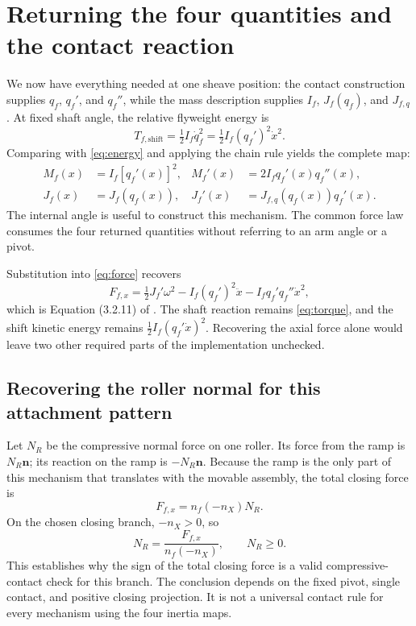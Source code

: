 \documentclass[11pt,letterpaper]{article}
\numberwithin{equation}{section}
\newcommand{\half}{\tfrac12}
\begin{document}
\section{Returning the four quantities and the contact reaction}
\label{sec:maps}

We now have everything needed at one sheave position: the contact construction supplies $q_f$, $q_f'$, and $q_f''$, while the mass description supplies $I_f$, $J_f(q_f)$, and $J_{f,q}$. At fixed shaft angle, the relative flyweight energy is
\begin{equation}
  T_{f,\mathrm{shift}}=\half I_f\dot q_f^2
                     =\half I_f(q_f')^2\dot x^2.
\end{equation}
Comparing with \cref{eq:energy} and applying the chain rule yields the complete map:
\begin{equation}
  \boxed{\begin{aligned}
    M_f(x)&=I_f[q_f'(x)]^2,&
    M_f'(x)&=2I_fq_f'(x)q_f''(x),\\
    J_f(x)&=J_f(q_f(x)),&
    J_f'(x)&=J_{f,q}(q_f(x))q_f'(x).
  \end{aligned}}
  \label{eq:four-maps}
\end{equation}
The internal angle is useful to construct this mechanism. The common force law consumes the four returned quantities without referring to an arm angle or a pivot.

Substitution into \cref{eq:force} recovers
\begin{equation}
  F_{f,x}=\half J_f'\omega^2-I_f(q_f')^2\ddot x
                                  -I_fq_f'q_f''\dot x^2,
  \label{eq:recovered-force}
\end{equation}
which is Equation (3.2.11) of \cite{formulation}. The shaft reaction remains \cref{eq:torque}, and the shift kinetic energy remains $\half I_f(q_f'\dot x)^2$. Recovering the axial force alone would leave two other required parts of the implementation unchecked.

\subsection{Recovering the roller normal for this attachment pattern}
\label{sec:normal-reaction}

Let $N_R$ be the compressive normal force on one roller. Its force from the ramp is $N_R\bm n$; its reaction on the ramp is $-N_R\bm n$. Because the ramp is the only part of this mechanism that translates with the movable assembly, the total closing force is
\begin{equation}
  F_{f,x}=n_f(-n_X)N_R.
\end{equation}
On the chosen closing branch, $-n_X>0$, so
\begin{equation}
  \boxed{N_R=\frac{F_{f,x}}{n_f(-n_X)},\qquad N_R\ge0.}
  \label{eq:roller-normal}
\end{equation}
This establishes why the sign of the total closing force is a valid compressive-contact check for this branch. The conclusion depends on the fixed pivot, single contact, and positive closing projection. It is not a universal contact rule for every mechanism using the four inertia maps.
\end{document}
